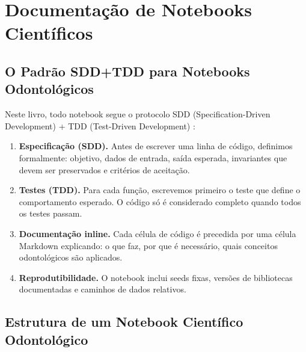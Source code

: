 \section{Documentação de Notebooks Científicos}

\subsection{O Padrão SDD+TDD para Notebooks Odontológicos}

Neste livro, todo notebook segue o protocolo SDD (Specification-Driven Development) + TDD (Test-Driven Development) :

\begin{enumerate}
    \item \textbf{Especificação (SDD).} Antes de escrever uma linha de código, definimos formalmente: objetivo, dados de entrada, saída esperada, invariantes que devem ser preservados e critérios de aceitação.
    \item \textbf{Testes (TDD).} Para cada função, escrevemos primeiro o teste que define o comportamento esperado. O código só é considerado completo quando todos os testes passam.
    \item \textbf{Documentação inline.} Cada célula de código é precedida por uma célula Markdown explicando: o que faz, por que é necessário, quais conceitos odontológicos são aplicados.
    \item \textbf{Reprodutibilidade.} O notebook inclui seeds fixas, versões de bibliotecas documentadas e caminhos de dados relativos.
\end{enumerate}

\subsection{Estrutura de um Notebook Científico Odontológico}

